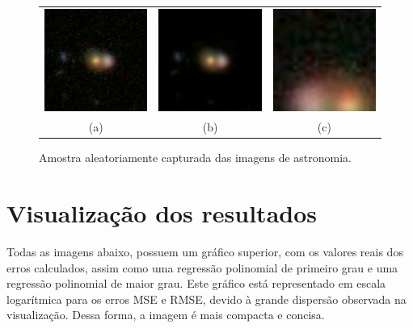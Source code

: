 \begin{figure}[H]
    \centering
    \caption{Amostra aleatoriamente capturada das imagens de astronomia.}
    \begin{tabular}{c c c}
        \includegraphics[width=4.2cm]{fig/samples/astronomy/astronomy_original.png} 
            & \includegraphics[width=4.2cm]{fig/samples/astronomy/astronomy_non_specific_training.png} 
            & \includegraphics[width=4.2cm]{fig/samples/astronomy/astronomy_specific_training.png} \\
        (a) & (b) & (c)
    \end{tabular}
    \label{fig:img-results:fig2}
\end{figure}

\section{Visualização dos resultados}
\label{sec:visualizacao-resultado}

Todas as imagens abaixo, possuem um gráfico superior, com os valores reais dos erros calculados, assim como uma regressão polinomial de primeiro grau e uma regressão polinomial de maior grau. Este gráfico está representado em escala logarítmica para os erros MSE e RMSE, devido à grande dispersão observada na visualização. Dessa forma, a imagem é mais compacta e concisa. 


